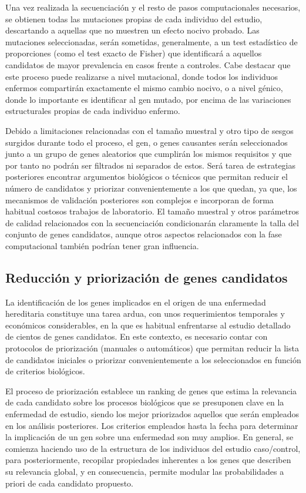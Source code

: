 \medskip
Una vez realizada la secuenciación y el resto de pasos computacionales necesarios, se obtienen todas las mutaciones propias de cada individuo del estudio, descartando a aquellas que no muestren un efecto nocivo probado. Las mutaciones seleccionadas, serán sometidas, generalmente, a un test estadístico de proporciones (como el test exacto de Fisher) que identificará a aquellos candidatos de mayor prevalencia en casos frente a controles. Cabe destacar que este proceso puede realizarse a nivel mutacional, donde todos los individuos enfermos compartirán exactamente el mismo cambio nocivo, o a nivel génico, donde lo importante es identificar al gen mutado, por encima de las variaciones estructurales propias de cada individuo enfermo.

\medskip
Debido a limitaciones relacionadas con el tamaño muestral y otro tipo de sesgos surgidos durante todo el proceso, el gen, o genes causantes serán seleccionados junto a un grupo de genes aleatorios que cumplirán los mismos requisitos y que por tanto no podrán ser filtrados ni separados de estos. Será tarea de estrategias posteriores encontrar argumentos biológicos o técnicos que permitan reducir el número de candidatos y priorizar convenientemente a los que quedan, ya que, los mecanismos de validación posteriores son complejos e incorporan de forma habitual costosos trabajos de laboratorio. El tamaño muestral y otros parámetros de calidad relacionados con la secuenciación condicionarán claramente la talla del conjunto de genes candidatos, aunque otros aspectos relacionados con la fase computacional también podrían tener gran influencia.


\subsection{Reducción y priorización de genes candidatos}

La identificación de los genes implicados en el origen de una enfermedad hereditaria constituye una tarea ardua, con unos requerimientos temporales y económicos considerables, en la que es habitual enfrentarse al estudio detallado de cientos de genes candidatos. En este contexto, es necesario contar con protocolos de priorización (manuales o automáticos) que permitan reducir la lista de candidatos iniciales o priorizar convenientemente a los seleccionados en función de criterios biológicos.

\medskip
El proceso de priorización establece un ranking de genes que estima la relevancia de cada candidato sobre los procesos biológicos que se presuponen clave en la enfermedad de estudio, siendo los mejor priorizados aquellos que serán empleados en los análisis posteriores. Los criterios empleados hasta la fecha para determinar la implicación de un gen sobre una enfermedad son muy amplios. En general, se comienza haciendo uso de la estructura de los individuos del estudio caso/control, para posteriormente, recopilar propiedades inherentes a los genes que describen su relevancia global, y en consecuencia, permite modular las probabilidades a priori de cada candidato propuesto. 

